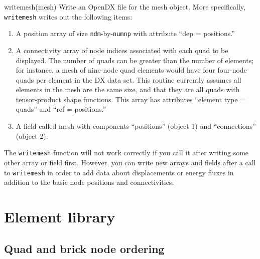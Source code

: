 \documentclass{article}
\newenvironment{codelist}[1][\quad]%
  {\begin{list}{}{%
   \settowidth{\labelwidth}{\texttt{#1}\hfil}%
   \setlength{\leftmargin}{\labelwidth}%
   \addtolength{\leftmargin}{\labelsep}%
   \addtolength{\leftmargin}{\parindent}%
   \renewcommand{\makelabel}[1]{\texttt{##1}}}}%
  {\end{list}}
\newcommand{\ttt}[1]{\texttt{#1}}
\begin{document}
\begin{codelist}
 \item[writemesh(mesh)]
   Write an OpenDX file for the mesh object.  More specifically,
   \ttt{writemesh} writes out the following items:
   \begin{enumerate}

    \item A position array of size \ttt{ndm}-by-\ttt{numnp}
          with attribute ``dep = positions.''

    \item A connectivity array of node indices associated with each
          quad to be displayed.  The number of quads can be greater
          than the number of elements; for instance, a mesh of
          nine-node quad elements would have four four-node quads per
          element in the DX data set.  This routine currently assumes
          all elements in the mesh are the same size, and that they
          are all quads with tensor-product shape functions.  This
          array has attributes ``element type = quads'' and ``ref =
          positions.''

    \item A field called mesh with components ``positions'' (object 1)
          and ``connections'' (object 2).

   \end{enumerate}
   The \ttt{writemesh} function will not work correctly if you call
   it after writing some other array or field first.  However, you can
   write new arrays and fields after a call to \ttt{writemesh} in
   order to add data about displacements or energy fluxes in addition
   to the basic node positions and connectivities.

\end{codelist}


\section{Element library}


\subsection{Quad and brick node ordering}
\end{document}
